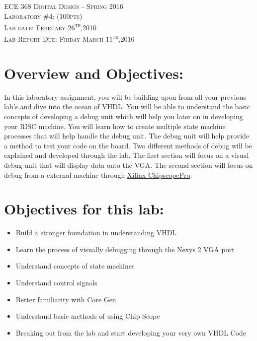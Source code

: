 \documentclass{article}
\begin{document}
\begin{center}
\textsc{\huge ECE 368 Digital Design - Spring 2016}\\[1cm]
\textsc{{\LARGE Laboratory \#4: (100pts)}}\\[0.5cm]
\textsc{\Large Lab date: February $26$\textsuperscript{th},2016}\\[0.5cm]
\textsc{\Large Lab Report Due: Friday March $11$\textsuperscript{th},2016}\\[1cm]
\end{center}

\section{Overview and Objectives:}
In this laboratory assignment, you will be building upon from all your previous lab's and dive into the ocean of VHDL. You will be able to understand the basic concepts of developing a debug unit which will help you later on in developing your RISC machine. You will learn how to create multiple state machine processes that will help handle the debug unit. The debug unit will help provide a method to test your code on the board. Two different methods of debug will be explained and developed through the lab. The first section will focus on a visual debug unit that will display data onto the VGA. The second section will focus on debug from a external machine through \href{http://www.xilinx.com/products/design-tools/chipscopepro.html}{Xilinx\textsuperscript{\textregistered} Chipscope\texttrademark Pro}.

\section{Objectives for this lab:}
\begin{itemize}
  \item Build a stronger foundation in understanding VHDL
  \item Learn the process of visually debugging through the Nexys 2 VGA port
  \item Understand concepts of state machines
  \item Understand control signals
  \item Better familiarity with Core Gen
  \item Understand basic methods of using Chip Scope
  \item Breaking out from the lab and start developing your very own VHDL Code
\end{itemize}
\end{document}
